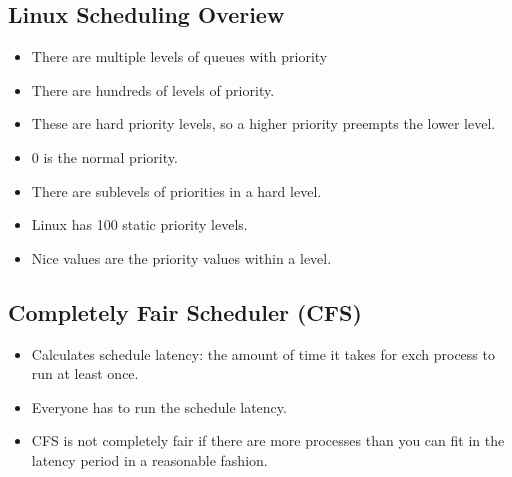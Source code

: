 \documentclass[]{article}
\begin{document}
\subsection{Linux Scheduling Overiew}
\begin{itemize}
\item There are multiple levels of queues with priority
\item There are hundreds of levels of priority.
\item These are hard priority levels, so a higher priority preempts the lower level.
\item 0 is the normal priority.
\item There are sublevels of priorities in a hard level.
\item Linux has 100 static priority levels.
\item Nice values are the priority values within a level.
\end{itemize}

\subsection{Completely Fair Scheduler (CFS)}
\begin{itemize}
\item Calculates schedule latency: the amount of time it takes for exch process to run at least once.
\item Everyone has to run the schedule latency.
\item CFS is not completely fair if there are more processes than you can fit in the latency period in a reasonable fashion.
\end{itemize}
\end{document}
